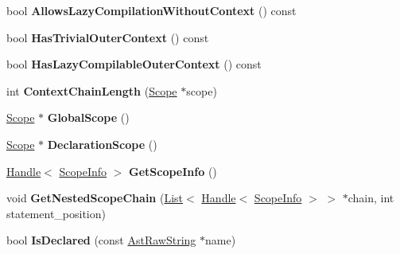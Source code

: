 \begin{DoxyCompactItemize}
\item 
\hypertarget{classv8_1_1internal_1_1_scope_a26b0d5a2fa5d22c3822aaee0b6eacf16}{}bool {\bfseries Allows\+Lazy\+Compilation\+Without\+Context} () const \label{classv8_1_1internal_1_1_scope_a26b0d5a2fa5d22c3822aaee0b6eacf16}

\item 
\hypertarget{classv8_1_1internal_1_1_scope_a013580c95b228155f384966c8efe32db}{}bool {\bfseries Has\+Trivial\+Outer\+Context} () const \label{classv8_1_1internal_1_1_scope_a013580c95b228155f384966c8efe32db}

\item 
\hypertarget{classv8_1_1internal_1_1_scope_a85707e9dc46da954d8e27e62e3c081e2}{}bool {\bfseries Has\+Lazy\+Compilable\+Outer\+Context} () const \label{classv8_1_1internal_1_1_scope_a85707e9dc46da954d8e27e62e3c081e2}

\item 
\hypertarget{classv8_1_1internal_1_1_scope_a529511c688fa9164e09a39ef9dc65e67}{}int {\bfseries Context\+Chain\+Length} (\hyperlink{classv8_1_1internal_1_1_scope}{Scope} $\ast$scope)\label{classv8_1_1internal_1_1_scope_a529511c688fa9164e09a39ef9dc65e67}

\item 
\hypertarget{classv8_1_1internal_1_1_scope_abed0afee87ba555c0194c5d5c4540a4b}{}\hyperlink{classv8_1_1internal_1_1_scope}{Scope} $\ast$ {\bfseries Global\+Scope} ()\label{classv8_1_1internal_1_1_scope_abed0afee87ba555c0194c5d5c4540a4b}

\item 
\hypertarget{classv8_1_1internal_1_1_scope_aa39f7b4d3208196486b1e535228ab2a2}{}\hyperlink{classv8_1_1internal_1_1_scope}{Scope} $\ast$ {\bfseries Declaration\+Scope} ()\label{classv8_1_1internal_1_1_scope_aa39f7b4d3208196486b1e535228ab2a2}

\item 
\hypertarget{classv8_1_1internal_1_1_scope_ae179acd04199865c85c9a0c3ca6d0790}{}\hyperlink{classv8_1_1internal_1_1_handle}{Handle}$<$ \hyperlink{classv8_1_1internal_1_1_scope_info}{Scope\+Info} $>$ {\bfseries Get\+Scope\+Info} ()\label{classv8_1_1internal_1_1_scope_ae179acd04199865c85c9a0c3ca6d0790}

\item 
\hypertarget{classv8_1_1internal_1_1_scope_af5718c80c576d2d9de1eae1d676d409a}{}void {\bfseries Get\+Nested\+Scope\+Chain} (\hyperlink{classv8_1_1internal_1_1_list}{List}$<$ \hyperlink{classv8_1_1internal_1_1_handle}{Handle}$<$ \hyperlink{classv8_1_1internal_1_1_scope_info}{Scope\+Info} $>$ $>$ $\ast$chain, int statement\+\_\+position)\label{classv8_1_1internal_1_1_scope_af5718c80c576d2d9de1eae1d676d409a}

\item 
\hypertarget{classv8_1_1internal_1_1_scope_a99973033fe4c8e41f85b7ffbccf00aef}{}bool {\bfseries Is\+Declared} (const \hyperlink{classv8_1_1internal_1_1_ast_raw_string}{Ast\+Raw\+String} $\ast$name)\label{classv8_1_1internal_1_1_scope_a99973033fe4c8e41f85b7ffbccf00aef}

\end{DoxyCompactItemize}
